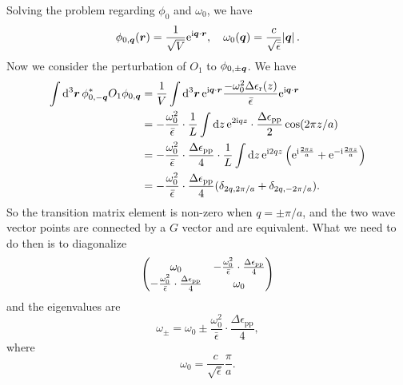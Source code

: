 \documentclass[hyperref, a4paper]{article}
\newcommand*{\ii}{\mathrm{i}}
\newcommand*{\ee}{\mathrm{e}}
\newcommand{\epsr}{\epsilon_{\text{r}}}
\begin{document}
Solving the problem regarding $\phi_0$ and $\omega_0$, we have 
\begin{equation}
    \phi_{0, \vb*{q}}(\vb*{r}) = \frac{1}{\sqrt{V}} \ee^{\ii \vb*{q} \cdot \vb*{r}}, \quad 
    \omega_0(\vb*{q}) = \frac{c}{\sqrt{\bar{\epsilon}}} \abs*{\vb*{q}}.
\end{equation}
Now we consider the perturbation of $O_1$ to $\phi_{0, \pm \vb*{q}}$. We have 
\begin{equation}
    \begin{aligned}
        \int \dd[3]{\vb*{r}} \phi_{0, - \vb*{q}}^* O_1 \phi_{0, \vb*{q}}
        &= \frac{1}{V} \int \dd[3]{\vb*{r}} \ee^{\ii \vb*{q} \cdot \vb*{r}} 
        \frac{- \omega_0^2 \Delta \epsr(z)}{\bar{\epsilon}} 
        \ee^{\ii \vb*{q} \cdot \vb*{r}} \\
        &= - \frac{\omega_0^2}{\bar{\epsilon}} \cdot 
        \frac{1}{L} \int \dd{z} \ee^{2 \ii q z} \cdot \frac{\Delta \epsilon_\text{pp}}{2} \cos(2 \pi z / a) \\
        &= - \frac{\omega_0^2}{\bar{\epsilon}} \cdot \frac{\Delta \epsilon_\text{pp}}{4}
        \cdot \frac{1}{L} \int \dd{z} \ee^{\ii 2 q z} \left(
            \ee^{\ii \frac{2 \pi z}{a}} + \ee^{- \ii \frac{2 \pi z}{a}}
        \right) \\
        &= - \frac{\omega_0^2}{\bar{\epsilon}} \cdot \frac{\Delta \epsilon_\text{pp}}{4}
        (\delta_{2q, 2\pi / a} + \delta_{2q, - 2\pi / a}).
    \end{aligned}
\end{equation}
So the transition matrix element is non-zero when $q = \pm \pi / a$,
and the two wave vector points are connected by a $G$ vector and are equivalent.
What we need to do then is to diagonalize 
\begin{equation}
    \pmqty{
        \omega_0 & - \frac{\omega_0^2}{\bar{\epsilon}} \cdot \frac{\Delta \epsilon_\text{pp}}{4} \\
        - \frac{\omega_0^2}{\bar{\epsilon}} \cdot \frac{\Delta \epsilon_\text{pp}}{4} & \omega_0 
    }
\end{equation}
and the eigenvalues are 
\begin{equation}
    \omega_\pm = \omega_0 \pm \frac{\omega_0^2}{\bar{\epsilon}} \cdot \frac{\Delta \epsilon_\text{pp}}{4},
\end{equation}
where 
\begin{equation}
    \omega_0 = \frac{c}{\sqrt{\bar{\epsilon}}} \frac{\pi}{a}.
\end{equation}
\end{document}

